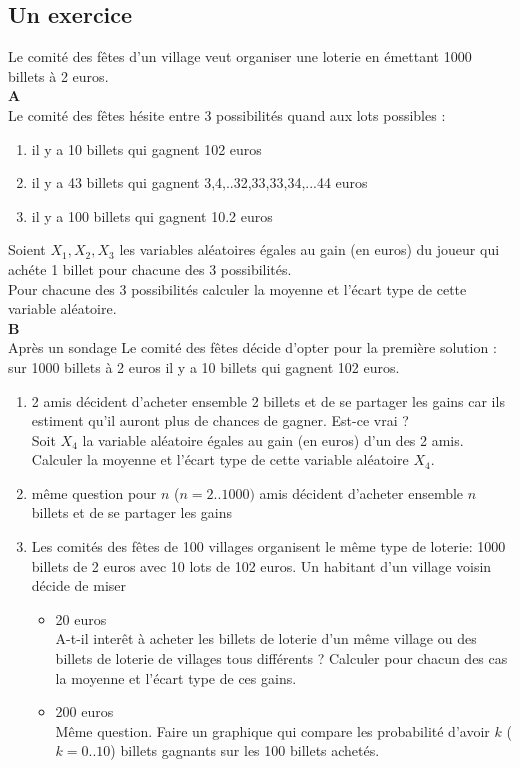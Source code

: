 \documentclass[a4paper,11pt]{book}
\begin{document}
\subsection{Un exercice}
Le comit\'e des f\^etes d'un village veut organiser une loterie en \'emettant 
1000 billets \`a 2 euros.\\
{\bf A}\\ 
Le comit\'e des f\^etes h\'esite entre 3 possibilit\'es quand aux lots 
possibles :\\
\begin{enumerate}
\item il y a 10 billets qui gagnent 102 euros
\item il y a 43 billets qui gagnent 3,4,..32,33,33,34,...44 euros
\item il y a 100 billets qui gagnent 10.2 euros
\end{enumerate}
Soient $X_1,X_2,X_3$ les variables al\'eatoires \'egales au gain (en euros) du 
joueur qui ach\'ete 1 billet pour chacune des 3 possibilit\'es.\\
Pour chacune des 3 possibilit\'es calculer la moyenne et l'\'ecart type de 
cette variable al\'eatoire.\\
{\bf B}\\ 
Apr\`es un sondage Le comit\'e des f\^etes d\'ecide d'opter pour la premi\`ere 
solution :\\
sur 1000 billets \`a 2 euros il y a 10 billets qui gagnent 102 euros.\\
\begin{enumerate}
\item 2 amis d\'ecident d'acheter ensemble 2 billets et de se partager les 
gains car ils estiment qu'il auront plus de chances de gagner. Est-ce vrai ?\\
Soit $X_4$ la variable al\'eatoire \'egales au gain (en euros) d'un des 2 amis. 
Calculer la moyenne et l'\'ecart type de cette variable al\'eatoire $X_4$.
\item m\^eme question pour $n$ ($n=2..1000)$ amis d\'ecident d'acheter ensemble
 $n$ billets et de se partager les gains
\item Les comit\'es des f\^etes de 100 villages organisent le m\^eme type de 
loterie: 1000 billets de 2 euros avec 10 lots de 102 euros. Un habitant d'un 
village voisin d\'ecide de miser 
\begin{itemize}
\item 20  euros\\
A-t-il inter\^et \`a acheter les billets de loterie d'un m\^eme village ou 
des billets de loterie de villages tous diff\'erents ?
Calculer pour chacun des cas la moyenne et l'\'ecart type de ces gains.
\item 200  euros\\
M\^eme question.
Faire un graphique qui compare les probabilit\'e d'avoir $k$  ($k=0..10$) 
billets gagnants sur les 100 billets achet\'es.
\end{itemize}
\end{enumerate}
\end{document}
